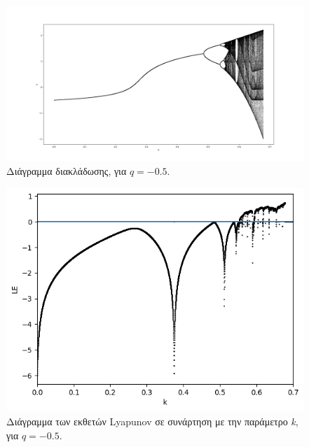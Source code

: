 \begin{figure}[ht]
	\centering
	\includegraphics[width=1\linewidth]{LateX images/graphs q05/g1}
	\caption{ Διάγραμμα διακλάδωσης, για $q=-0.5$.}
	\label{f:g10}
\end{figure}

\begin{figure}[ht]
	\centering
	\includegraphics[width=1\linewidth]{LateX images/graphs q05/g2}
	\caption{ Διάγραμμα των εκθετών Lyapunov σε συνάρτηση με την παράμετρο \emph{k}, για $q=-0.5$.}
	\label{f:g11}
\end{figure}

